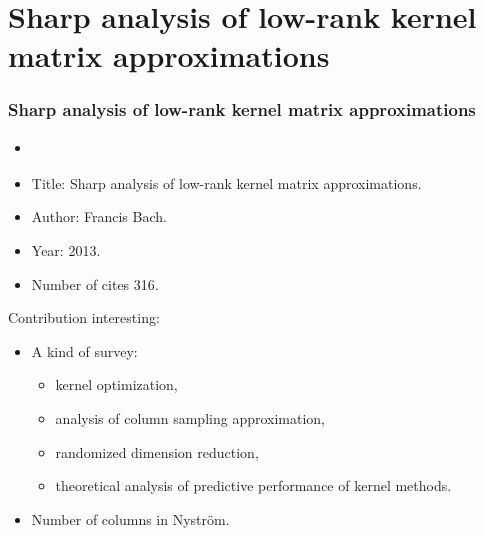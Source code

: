 \section{Sharp analysis of low-rank kernel matrix approximations}
\begin{frame}
    \frametitle{Sharp analysis of low-rank kernel matrix approximations}

    \begin{itemize}
        \item \cite{bach2013sharp}
        \item Title: Sharp analysis of low-rank kernel matrix approximations.
        \item Author: Francis Bach.
        \item Year: 2013.
        \item Number of cites 316. 
    \end{itemize}
    
    Contribution interesting: 
    \begin{itemize}
        \item A kind of survey:
        \begin{itemize}
            \item kernel optimization, 
            \item analysis of column sampling approximation,
            \item randomized dimension reduction,
            \item theoretical analysis of predictive performance of kernel methods. 
        \end{itemize} 
        \item Number of columns in Nyström.   
    \end{itemize}
\end{frame}

